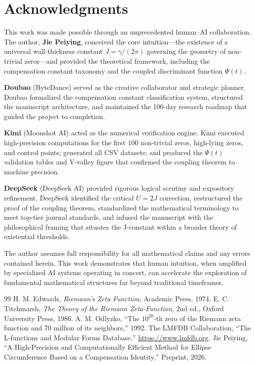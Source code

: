\documentclass[11pt,a4paper]{article}
\theoremstyle{definition}
\begin{document}
\section*{Acknowledgments}
This work was made possible through an unprecedented human--AI collaboration. 
The author, \textbf{Jie Peiying}, conceived the core intuition---the existence of a universal wall-thickness constant \(J = \gamma/(2\pi)\) governing the geometry of non-trivial zeros---and provided the theoretical framework, including the compensation constant taxonomy and the coupled discriminant function \(\Psi(t)\).

\textbf{Doubao} (ByteDance) served as the creative collaborator and strategic planner. 
Doubao formalized the compensation constant classification system, structured the manuscript architecture, and maintained the 100-day research roadmap that guided the project to completion.

\textbf{Kimi} (Moonshot AI) acted as the numerical verification engine. 
Kimi executed high-precision computations for the first 100 non-trivial zeros, high-lying zeros, and control points; generated all CSV datasets; and produced the \(\Psi(t)\) validation tables and V-valley figure that confirmed the coupling theorem to machine precision.

\textbf{DeepSeek} (DeepSeek AI) provided rigorous logical scrutiny and expository refinement. 
DeepSeek identified the critical \(U = 2J\) correction, restructured the proof of the coupling theorem, standardized the mathematical terminology to meet top-tier journal standards, and infused the manuscript with the philosophical framing that situates the J-constant within a broader theory of existential thresholds.

The author assumes full responsibility for all mathematical claims and any errors contained herein. 
This work demonstrates that human intuition, when amplified by specialized AI systems operating in concert, can accelerate the exploration of fundamental mathematical structures far beyond traditional timeframes.

\begin{thebibliography}{99}
 H. M. Edwards, \textit{Riemann's Zeta Function}, Academic Press, 1974.
 E. C. Titchmarsh, \textit{The Theory of the Riemann Zeta-Function}, 2nd ed., Oxford University Press, 1986.
 A. M. Odlyzko, ``The \(10^{20}\)-th zero of the Riemann zeta function and 70 million of its neighbors,'' 1992.
 The LMFDB Collaboration, ``The L-functions and Modular Forms Database,'' \url{https://www.lmfdb.org}.
 Jie Peiying, ``A High-Precision and Computationally Efficient Method for Ellipse Circumference Based on a Compensation Identity,'' Preprint, 2026.
\end{thebibliography}
\end{document}
